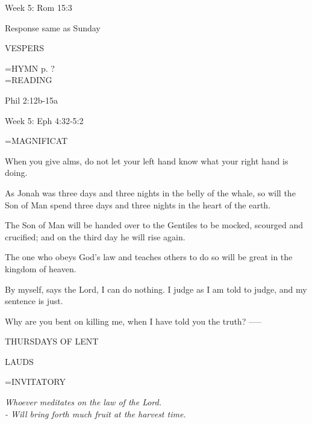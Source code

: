 Week 5:    Rom 15:3    

Response same as Sunday

\begin{flushleft}\normalsize VESPERS\\\end{flushleft}
\hangindent=\parindent \small{\uppercase{HYMN} p.  ?\\}
\hangindent=\parindent \small READING
\begin{description}[labelindent=\parindent, leftmargin=*]
\item [Ash Wednesday \& Weeks 1-4:]     Phil 2:12b-15a \textbf{}
\end{description}

Week 5:    Eph 4:32-5:2    

\hangindent=\parindent \small MAGNIFICAT
\begin{description}[labelindent=\parindent, noitemsep, leftmargin=*]
\item [Ash Wednesday:] 	When you give alms, do not let your left hand know what your right hand is doing.
\item [Week 1:] 	As Jonah was three days and three nights in the belly of the whale, so will the Son of Man spend three days and three nights in the heart of the earth.
\item [Week 2:] 	The Son of Man will be handed over to the Gentiles to be mocked, scourged and crucified; and on the third day he will rise again.
\item [Week 3:] 	The one who obeys God's law and teaches others to do so will be great in the kingdom of heaven.
\item [Week 4:] 	By myself, says the Lord, I can do nothing. I judge as I am told to judge, and my sentence is just.
\item [Week 5:] 	Why are you bent on killing me, when I have told you the truth?
-----
\begin{center}
\normalsize THURSDAYS OF LENT
\end{center}
\end{description}

\begin{flushleft}\normalsize LAUDS\\\end{flushleft}
\hangindent=\parindent \small{INVITATORY}
\begin{center}
\textit{Whoever meditates on the law of the Lord.\\}
\textit{- Will bring forth much fruit at the harvest time.\\}
\end{center}


